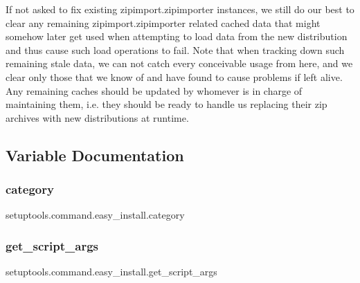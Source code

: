 \begin{DoxyVerb}
If not asked to fix existing zipimport.zipimporter instances, we still do
our best to clear any remaining zipimport.zipimporter related cached data
that might somehow later get used when attempting to load data from the new
distribution and thus cause such load operations to fail. Note that when
tracking down such remaining stale data, we can not catch every conceivable
usage from here, and we clear only those that we know of and have found to
cause problems if left alive. Any remaining caches should be updated by
whomever is in charge of maintaining them, i.e. they should be ready to
handle us replacing their zip archives with new distributions at runtime.\end{DoxyVerb}
 

\subsection{Variable Documentation}
\mbox{\label{namespacesetuptools_1_1command_1_1easy__install_aee298a1c6afa16b18a8b1ad432b6f88a}} 
\subsubsection{\texorpdfstring{category}{category}}
{\footnotesize\ttfamily setuptools.\+command.\+easy\+\_\+install.\+category}

\mbox{\label{namespacesetuptools_1_1command_1_1easy__install_a267b9ab1d7874774429df54a3da6ad66}} 
\subsubsection{\texorpdfstring{get\+\_\+script\+\_\+args}{get\_script\_args}}
{\footnotesize\ttfamily setuptools.\+command.\+easy\+\_\+install.\+get\+\_\+script\+\_\+args}

\mbox{\label{namespacesetuptools_1_1command_1_1easy__install_ab52dc3bb25810daf44071c5f8e29e1f1}} 
